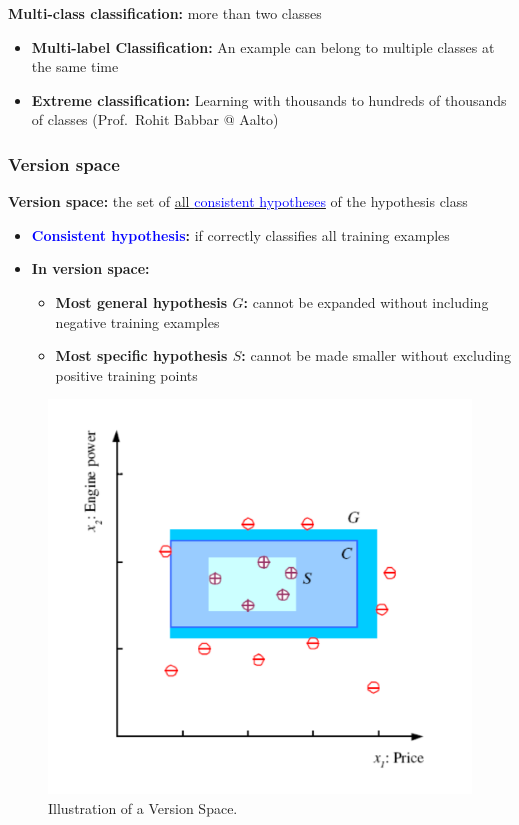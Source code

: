\documentclass[12pt, a4paper]{article}
\begin{document}
\textbf{Multi-class classification:} more than two classes

\begin{itemize}
  \item \textbf{Multi-label Classification:} An example can belong to multiple classes at the same time
  \item \textbf{Extreme classification:} Learning with thousands to hundreds of thousands of classes (Prof.~Rohit Babbar @ Aalto)
\end{itemize}



\subsubsection{Version space}\label{version-space}

\textbf{Version space:} the set of \uline{all \textcolor{blue}{consistent hypotheses}} of the
hypothesis class

\begin{itemize}
  \item
    \textbf{\textcolor{blue}{Consistent hypothesis}:} if correctly classifies all training
    examples
  \item
    \textbf{In version space:}
  \begin{itemize}
    \item
      \textbf{Most general hypothesis $G$:} cannot be expanded without
      including negative training examples
    \item
      \textbf{Most specific hypothesis $S$:} cannot be made smaller
      without excluding positive training points
  \end{itemize}
\end{itemize}

\begin{figure}[H]
  \centering  %
    \includegraphics[width=0.5\columnwidth]{images/version-space.png}
    \caption{Illustration of a Version Space.}
    \label{fig:fig2}
\end{figure}
\end{document}
